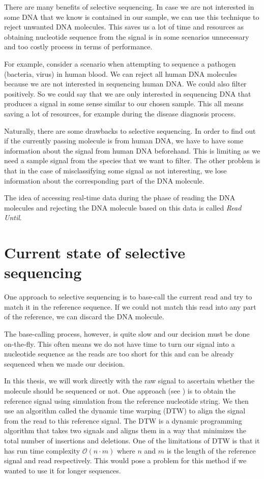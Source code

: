 There are many benefits of selective sequencing. In case we are not interested
in some DNA that we know is contained in our sample, we can use this technique to
reject unwanted DNA molecules. This saves us a lot of time and resources as obtaining
nucleotide sequence from the signal is in some scenarios unnecessary and too
costly process in terms of performance.

For example, consider a scenario when attempting to sequence a pathogen (bacteria, virus) in human blood. We can
reject all human DNA molecules because we are not interested in sequencing human
DNA. We could also filter positively. So we could say that we are only
interested in sequencing DNA that produces a signal in some sense similar to our
chosen sample. This all means saving a lot of resources, for example during the disease diagnosis process.

Naturally, there are some drawbacks to selective sequencing. In order to find out
if the currently passing molecule is from human DNA, we have to have some information
about the signal from human DNA beforehand. This is limiting as we need a sample signal from
the species that we want to filter. The other problem is that in the case of misclassifying
some signal as not interesting, we lose information about the corresponding
part of the DNA molecule.

The idea of accessing real-time data during the phase of reading the DNA molecules
and rejecting the DNA molecule based on this data is called \textit{Read Until}. 

\section{Current state of selective sequencing}


One approach to selective sequencing is to base-call the current read
and try to match it in the reference sequence. If we could not match this read
into any part of the reference, we can discard the DNA molecule.

The base-calling process, however, is quite slow and our decision must be done on-the-fly.
This often means we do not have time to turn our signal into a nucleotide sequence
as the reads are too short for this and can be already sequenced when we made our decision.

In this thesis, we will work directly with the raw signal to ascertain whether the molecule
should be sequenced or not. One approach (see \cite{loose2016real}) is to obtain the reference signal using
simulation from the reference nucleotide string. We then use an algorithm called
the dynamic time warping (DTW) to align the signal from the read to this reference signal.
The DTW is a dynamic programming algorithm that takes two signals and aligns them in a
way that minimizes the total number of insertions and deletions. One of the limitations
of DTW is that it has run time complexity $\mathcal{O}(n\cdot m)$ where $n$ and $m$
is the length of the reference signal and read respectively. This would pose a problem
for this method if we wanted to use it for longer sequences.

